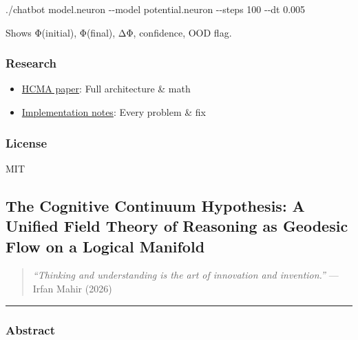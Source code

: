 \documentclass[
  11pt,
  a4paper,
]{article}
\newenvironment{Shaded}{\begin{snugshade}}{\end{snugshade}}
\newcommand{\AttributeTok}[1]{\textcolor[rgb]{0.13,0.29,0.53}{#1}}
\newcommand{\ExtensionTok}[1]{#1}
\newcommand{\NormalTok}[1]{#1}
\providecommand{\tightlist}{%
  \setlength{\itemsep}{0pt}\setlength{\parskip}{0pt}}
\begin{document}
\begin{Shaded}
\begin{Highlighting}[]
\ExtensionTok{./chatbot}\NormalTok{ model.neuron }\AttributeTok{{-}{-}model}\NormalTok{ potential.neuron }\AttributeTok{{-}{-}steps}\NormalTok{ 100 }\AttributeTok{{-}{-}dt}\NormalTok{ 0.005}
\end{Highlighting}
\end{Shaded}

Shows Φ(initial), Φ(final), ΔΦ, confidence, OOD flag.

\subsubsection{Research}\label{research}

\begin{itemize}
\tightlist
\item
  \href{research-paper/hcma.md}{HCMA paper}: Full architecture \& math
\item
  \href{contributing/how_we_implement.md}{Implementation notes}: Every
  problem \& fix
\end{itemize}

\subsubsection{License}\label{license}

MIT

\newpage

\subsection{The Cognitive Continuum Hypothesis: A Unified Field Theory
of Reasoning as Geodesic Flow on a Logical
Manifold}\label{the-cognitive-continuum-hypothesis-a-unified-field-theory-of-reasoning-as-geodesic-flow-on-a-logical-manifold}

\begin{quote}
\emph{``Thinking and understanding is the art of innovation and
invention.''} --- Irfan Mahir (2026)
\end{quote}

\begin{center}\rule{0.5\linewidth}{0.5pt}\end{center}

\subsubsection{Abstract}\label{abstract-2}
\end{document}
